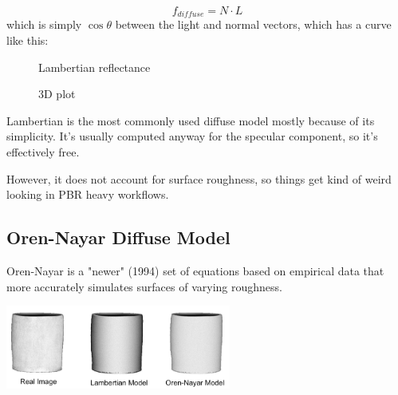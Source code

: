 \documentclass[12pt,letterpaper]{article}
\begin{document}
$$
f_{diffuse} = N \cdot L
$$
which is simply $\cos \theta$ between the light and normal vectors, which has a curve like this:
\begin{figure}[htbp]
  \begin{minipage}[b]{0.5\linewidth}
    \centering
    \pgfplotsset{width=15em}
    \caption{Lambertian reflectance}
  \end{minipage}
  \hspace{-16pt}
  \begin{minipage}[b]{0.5\linewidth}
    \centering
	\pgfplotsset{width=20em}
    \caption{3D plot}
  \end{minipage}
\end{figure}

Lambertian is the most commonly used diffuse model mostly because of its simplicity. 
It's usually computed anyway for the specular component, so it's effectively free.

However, it does not account for surface roughness, so things get kind of weird looking in PBR heavy workflows.

\newpage

\subsection{Oren-Nayar Diffuse Model}

Oren-Nayar is a "newer" (1994) set of equations based on empirical data that more accurately simulates surfaces of varying roughness.

\begin{center}
    \includegraphics[width=20em]{Oren-nayar-vase2}
\end{center}
\end{document}
